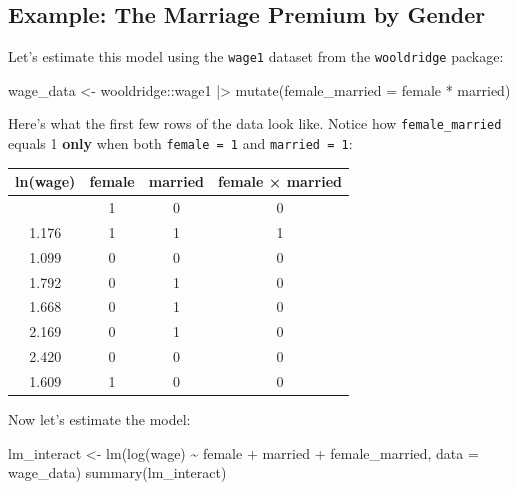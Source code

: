 \documentclass[
  letterpaper,
  DIV=11,
  numbers=noendperiod]{scrreprt}
\newenvironment{Shaded}{\begin{snugshade}}{\end{snugshade}}
\newcommand{\AttributeTok}[1]{\textcolor[rgb]{0.40,0.45,0.13}{#1}}
\newcommand{\FunctionTok}[1]{\textcolor[rgb]{0.28,0.35,0.67}{#1}}
\newcommand{\NormalTok}[1]{\textcolor[rgb]{0.00,0.23,0.31}{#1}}
\newcommand{\OtherTok}[1]{\textcolor[rgb]{0.00,0.23,0.31}{#1}}
\newcommand{\SpecialCharTok}[1]{\textcolor[rgb]{0.37,0.37,0.37}{#1}}
\newcounter{none} %
\begin{document}
\subsection{Example: The Marriage Premium by
Gender}\label{example-the-marriage-premium-by-gender}

Let's estimate this model using the \texttt{wage1} dataset from the
\texttt{wooldridge} package:

\begin{Shaded}
\begin{Highlighting}[]
\NormalTok{wage\_data }\OtherTok{\textless{}{-}}\NormalTok{ wooldridge}\SpecialCharTok{::}\NormalTok{wage1 }\SpecialCharTok{|\textgreater{}}
    \FunctionTok{mutate}\NormalTok{(}\AttributeTok{female\_married =}\NormalTok{ female }\SpecialCharTok{*}\NormalTok{ married)}
\end{Highlighting}
\end{Shaded}

Here's what the first few rows of the data look like. Notice how
\texttt{female\_married} equals 1 \textbf{only} when both
\texttt{female\ =\ 1} and \texttt{married\ =\ 1}:

{\def\LTcaptype{none} %
\begin{longtable}[]{@{}cccc@{}}
\toprule\noalign{}
ln(wage) & female & married & female × married \\
\midrule\noalign{}
\endhead
\bottomrule\noalign{}
\endlastfoot
1.131 & 1 & 0 & 0 \\
1.176 & 1 & 1 & 1 \\
1.099 & 0 & 0 & 0 \\
1.792 & 0 & 1 & 0 \\
1.668 & 0 & 1 & 0 \\
2.169 & 0 & 1 & 0 \\
2.420 & 0 & 0 & 0 \\
1.609 & 1 & 0 & 0 \\
\end{longtable}
}

Now let's estimate the model:

\begin{Shaded}
\begin{Highlighting}[]
\NormalTok{lm\_interact }\OtherTok{\textless{}{-}} \FunctionTok{lm}\NormalTok{(}\FunctionTok{log}\NormalTok{(wage) }\SpecialCharTok{\textasciitilde{}}\NormalTok{ female }\SpecialCharTok{+}\NormalTok{ married }\SpecialCharTok{+}\NormalTok{ female\_married, }\AttributeTok{data =}\NormalTok{ wage\_data)}
\FunctionTok{summary}\NormalTok{(lm\_interact)}
\end{Highlighting}
\end{Shaded}
\end{document}
